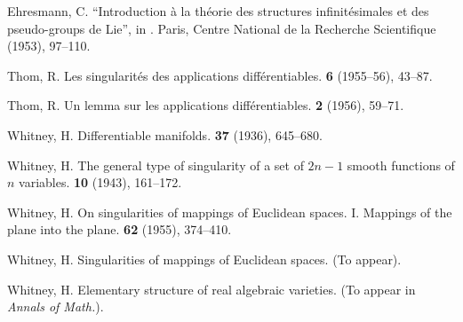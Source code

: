 \documentclass{article}
\theoremstyle{plain}
\theoremstyle{definition}
\begin{document}
\begin{thebibliography}{1}

  {\sc Ehresmann, C.}
  \newblock ``Introduction \`{a} la th\'{e}orie des structures infinit\'{e}simales et des pseudo-groups de Lie'', in
  .
  \newblock Paris, Centre National de la Recherche Scientifique (1953), 97--110.

  {\sc Thom, R.}
  \newblock Les singularit\'{e}s des applications diff\'{e}rentiables.
   \textbf{6} (1955--56), 43--87.

  {\sc Thom, R.}
  \newblock Un lemma sur les applications diff\'{e}rentiables.
   \textbf{2} (1956), 59--71.

  {\sc Whitney, H.}
  \newblock Differentiable manifolds.
   \textbf{37} (1936), 645--680.

  {\sc Whitney, H.}
  \newblock The general type of singularity of a set of $2n-1$ smooth functions of $n$ variables.
   \textbf{10} (1943), 161--172.

  {\sc Whitney, H.}
  \newblock On singularities of mappings of Euclidean spaces. I. Mappings of the plane into the plane.
   \textbf{62} (1955), 374--410.

  {\sc Whitney, H.}
  \newblock Singularities of mappings of Euclidean spaces.
  \newblock (To appear).

  {\sc Whitney, H.}
  \newblock Elementary structure of real algebraic varieties.
  \newblock (To appear in {\em Annals of Math.}).

\end{thebibliography}
\end{document}
